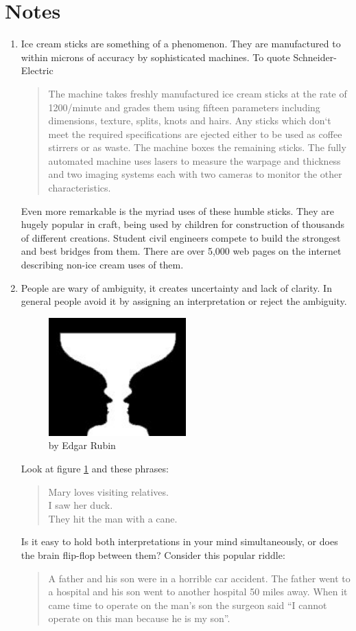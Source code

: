 \documentclass[a4paper,12pt,dvips]{article}
\begin{document}
\section{Notes}
\begin{enumerate}

\item \label{icecreamsticks} Ice cream sticks are something of a phenomenon. They are manufactured to within microns of accuracy by sophisticated machines. To quote Schneider-Electric \cite{SchneiderElectric}
\begin{quote}
The machine takes freshly manufactured ice cream sticks at the rate of 1200/minute and grades them using fifteen parameters including dimensions, texture, splits, knots and hairs. Any sticks which don`t meet the required specifications are ejected either to be used as coffee stirrers or as waste. The machine boxes the remaining sticks. The fully automated machine uses lasers to measure the warpage and thickness and two imaging systems each with two cameras to monitor the other characteristics. 
\end{quote}
Even more remarkable is the myriad uses of these humble sticks. They are hugely popular in craft, being used by children for construction of thousands of different creations. Student civil engineers compete to build the strongest and best bridges from them. There are over 5,000 web pages on the internet describing non-ice cream uses of them.

\item \label{uncertainty} People are wary of ambiguity, it creates uncertainty and lack of clarity. In general people avoid it by assigning an interpretation or reject the ambiguity. 
\begin{figure}[ht]
\centering
\includegraphics[width=0.50\textwidth]{vase}
\caption{by Edgar Rubin}
\label{fig:rubin}
\end{figure}
Look at figure \ref{fig:rubin} and these phrases:
\begin{quote}Mary loves visiting relatives.\\
I saw her duck.\\
They hit the man with a cane.\end{quote}
Is it easy to hold both interpretations in your mind simultaneously, or does the brain flip-flop between them? 
Consider this popular riddle: \begin{quote}
A father and his son were in a horrible car accident. The father went to a hospital and his son went to another hospital 50 miles away. When it came time to operate on the man's son the surgeon said ``I cannot operate on this man because he is my son''.
 

\end{quote}
\end{enumerate}
\end{document}
